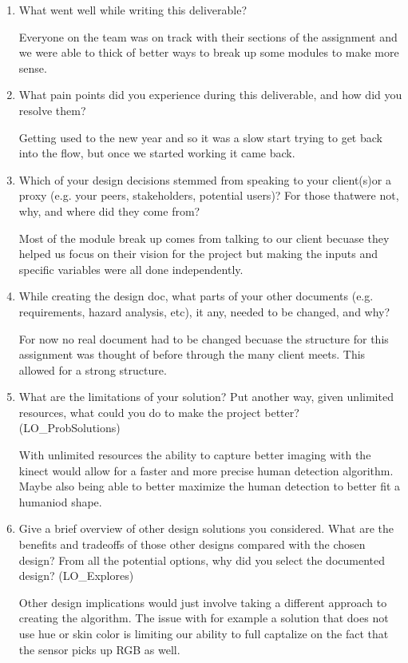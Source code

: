 \documentclass[12pt, titlepage]{article}
\begin{document}
\begin{enumerate}
  \item What went well while writing this deliverable? 

  Everyone on the team was on track with their sections of the assignment and we were able to thick of better ways to break up some modules to make more sense.

\item What pain points did you experience during this deliverable, and how did you resolve them?

  Getting used to the new year and so it was a slow start trying to get back into the flow, but once we started working it came back.

\item Which of your design decisions stemmed from speaking to your client(s)or a proxy (e.g. your peers, stakeholders, potential users)? For those thatwere not, why, and where did they come from?

  Most of the module break up comes from talking to our client becuase they helped us focus on their vision for the project but making the inputs and specific variables were all done independently.

\item While creating the design doc, what parts of your other documents (e.g.
  requirements, hazard analysis, etc), it any, needed to be changed, and why?

  For now no real document had to be changed becuase the structure for this assignment was thought of before through the many client meets. This allowed for a strong structure.

\item What are the limitations of your solution?  Put another way, given
  unlimited resources, what could you do to make the project better? (LO\_ProbSolutions)

  With unlimited resources the ability to capture better imaging with the kinect would allow for a faster and more precise human detection algorithm. Maybe also being able to better maximize the human detection to better fit a humaniod shape.
\item Give a brief overview of other design solutions you considered.  What
  are the benefits and tradeoffs of those other designs compared with the chosen
  design?  From all the potential options, why did you select the documented design?
  (LO\_Explores)

  Other design implications would just involve taking a different approach to creating the algorithm. The issue with for example a solution that does not use hue or skin color is limiting our ability to full captalize on the fact that the sensor picks up RGB as well.

\end{enumerate}
\end{document}
